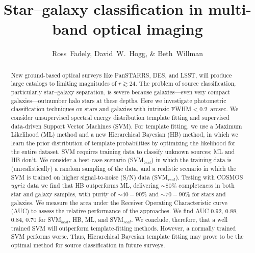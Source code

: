 \documentclass[12pt,preprint]{aastex}
\begin{document}
\title{Star--galaxy classification in multi-band optical imaging}
\author{Ross~Fadely,
        David~W.~Hogg,
        \& Beth~Willman}


%
%
\begin{abstract}
  New ground-based optical
  surveys like PanSTARRS, DES, and LSST, will produce large catalogs to 
  limiting magnitudes of $r \gtrsim 24$.  The problem of
  source classification, particularly star--galaxy separation,
  is severe because galaxies---even very compact galaxies---outnumber
  halo stars at these depths.  Here we investigate
  photometric classification
  techniques on stars and galaxies with intrinsic FWHM$<0.2$~arcsec.
  We consider unsupervised spectral energy distribution template fitting and
  supervised
  data-driven Support Vector Machines (SVM).  For template
  fitting, we use a Maximum Likelihood (ML) method and
  a new Hierarchical Bayesian (HB) method, in which we learn the prior
  distribution of template probabilities by optimizing the likelihood
  for the entire dataset.  SVM requires training
  data to classify unknown sources; ML and HB don't.  We consider a
  best-case scenario (SVM$_{best}$) in which the training data is (unrealistically) a
  random sampling of the data, and
  a realistic scenario in which the SVM is trained on higher
  signal-to-noise (S/N) data (SVM$_{real}$).
  Testing with COSMOS $ugriz$ data
  we find that
  HB outperforms ML, delivering
  $\sim80\%$ completeness in both star and galaxy samples, with purity
  of $\sim40-90\%$ and $\sim70-90\%$ for stars and galaxies.
  We measure the area under the Receiver Operating Characteristic curve (AUC) to assess the relative
  performance of the approaches.  We find AUC 0.92, 0.88, 0.84, 0.70 for
  SVM$_{best}$, HB, ML, and SVM$_{real}$.  We conclude,
  therefore, that a well trained SVM will outperform template-fitting
  methods.  However, a normally trained SVM performs worse.  Thus, Hierarchical Bayesian
  template fitting may prove to be the optimal method for
  source classification in future surveys.
\end{abstract}
\end{document}
